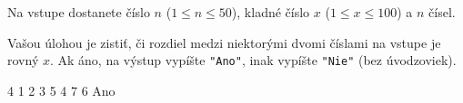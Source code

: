 




Na vstupe dostanete číslo $n$ ($1\leq n \leq 50$), kladné číslo $x$ ($1 \leq x \leq 100$) a $n$
čísel. 

Vašou úlohou je zistiť, či rozdiel medzi niektorými dvomi číslami na vstupe je rovný $x$. Ak
áno, na výstup vypíšte \texttt{"Ano"}, inak vypíšte \texttt{"Nie"} (bez úvodzoviek). 

 4
1 2 3 5 4 7 6
\vystup
Ano
\koniec


